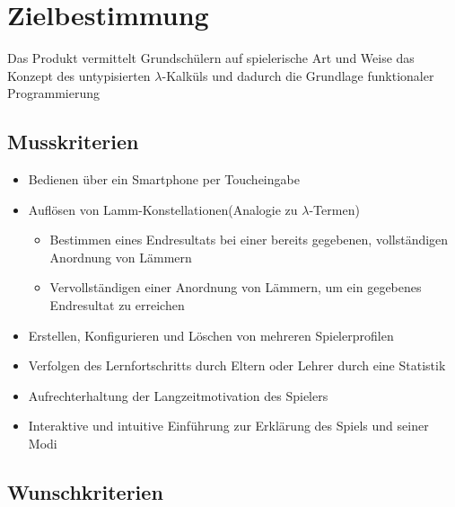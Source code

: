 \section{Zielbestimmung}

	Das Produkt vermittelt Grundschülern auf spielerische Art und Weise das Konzept des untypisierten $\lambda$-Kalküls und dadurch die Grundlage funktionaler Programmierung   			    

\subsection{Musskriterien}

\begin{itemize}
	\item Bedienen über ein Smartphone per Toucheingabe
	\item Auflösen von Lamm-Konstellationen(Analogie zu $\lambda$-Termen)
	\begin{itemize}
		\item Bestimmen eines Endresultats bei einer bereits gegebenen, vollständigen Anordnung von Lämmern 
		\item Vervollständigen einer Anordnung von Lämmern, um ein gegebenes Endresultat zu erreichen
	\end{itemize}
	\item Erstellen, Konfigurieren und Löschen von mehreren Spielerprofilen
	\item Verfolgen des Lernfortschritts durch Eltern oder Lehrer durch eine Statistik
	\item Aufrechterhaltung der Langzeitmotivation des Spielers
	\item Interaktive und intuitive Einführung zur Erklärung des Spiels und seiner Modi
\end{itemize}

\subsection{Wunschkriterien}

